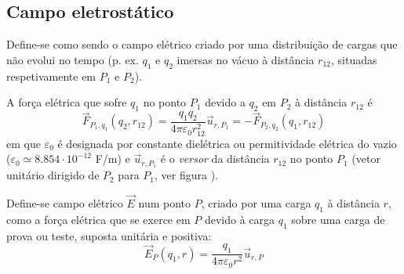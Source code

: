 \documentclass[a4paper,twoside,12pt]{article}      %
\begin{document}
\subsection{\sf Campo eletrostático}

Define-se como sendo o campo elétrico criado por uma distribuição de cargas que não evolui no tempo (p. ex. $q_1$ e $q_2$ imersas no vácuo à distância $r_{12}$, situadas respetivamente em $P_1$ e $P_2$).

A força elétrica que sofre $q_1$ no ponto $P_1$ devido a $q_2$ em $P_2$ à distância $r_{12}$ é
\begin{equation}
	\vec{F}_{P_1,q_1} (q_2, r_{1 2} ) = \frac{q_1 q_2}{4 \pi \varepsilon_0 r_{1 2}^2} \vec{u}_{r,P_1} = 
	- \vec{F}_{P_2,q_2} (q_1, r_{1 2} )
\end{equation}
em que $\varepsilon_0$  é designada por constante dielétrica ou permitividade elétrica do vazio ($\varepsilon_0 \simeq 8.854 \cdot 10^{-12}$ F/m) e	
 $\vec{u}_{r,P_1}$  é o \emph{versor} da distância $r_{1 2} $ no ponto $P_1$  (vetor unitário dirigido de $P_2$ para $P_1$, ver figura ).

Define-se campo elétrico $\vec{E}$  num ponto $P$, criado por uma carga $q_1$ à distância $r$, como a força elétrica que se exerce em $P$  devido à carga $q_1$ sobre uma carga de prova ou teste, suposta unitária e positiva:
\begin{equation}
	\vec{E}_P (q_1, r) = \frac{q_1}{4 \pi \varepsilon_0 r^2} \vec{u}_{r, P} 
\end{equation}
\end{document}

